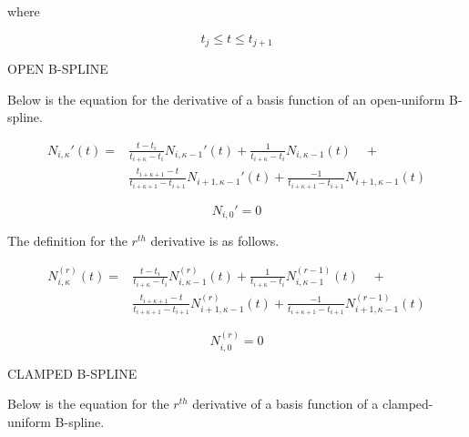 \documentclass{article}
\begin{document}
where

\begin{equation}
  t_{j} \leq t \le t_{j+1}
\end{equation}

OPEN B-SPLINE

\hspace{1cm}

Below is the equation for the derivative of a basis function of an open-uniform B-spline.

 \begin{equation} \label{eq:Basis function derivative equation}
 \begin{aligned}
  N_{i,\kappa}'(t) = &
  \frac{t - t_i}{t_{i+\kappa} - t_i} N_{i,\kappa-1}'(t) + \frac{1}{t_{i+\kappa} - t_i} N_{i,\kappa-1}(t) \quad + \\
  & \frac{t_{i+\kappa+1} - t}{t_{i+\kappa+1}-t_{i+1}} N_{i+1 , \kappa-1}'(t) +  \frac{-1}{t_{i+\kappa+1}-t_{i+1}} N_{i+1 , \kappa-1}(t)
  \end{aligned}
  \end{equation}
  
  \begin{equation}
      N_{i,0}' = 0
  \end{equation}

 \hspace{1cm}
 
 The definition for the \(r^{th}\) derivative is as follows.
 
  \begin{equation} \label{eq:Basis function rth derivative equation}
 \begin{aligned}
  N^{(r)}_{i,\kappa}(t) = &
  \frac{t - t_i}{t_{i+\kappa} - t_i} N^{(r)}_{i,\kappa-1}(t) + \frac{1}{t_{i+\kappa} - t_i} N^{(r-1)}_{i,\kappa-1}(t) \quad + \\
  & \frac{t_{i+\kappa+1} - t}{t_{i+\kappa+1}-t_{i+1}} N^{(r)}_{i+1 , \kappa-1}(t) +  \frac{-1}{t_{i+\kappa+1}-t_{i+1}} N^{(r-1)}_{i+1 , \kappa-1}(t)
  \end{aligned}
  \end{equation}
  
  \begin{equation}
      N^{(r)}_{i,0} = 0
  \end{equation}

CLAMPED B-SPLINE

\hspace{1cm}

Below is the equation for the \(r^{th}\) derivative of a basis function of a clamped-uniform B-spline.
 
\end{document}
